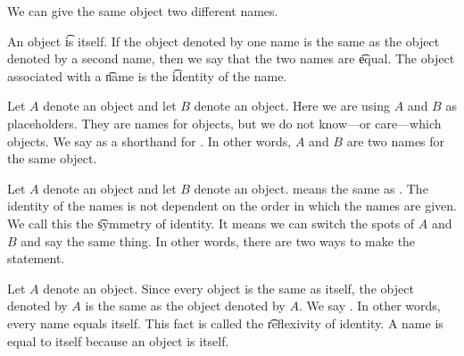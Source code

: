 

We can give the same object two different names.


An object \t{is} itself.
If the object denoted by one name is the same as the object denoted by a second name, then we say that the two names are \t{equal}.
The object associated with a \t{name} is the \t{identity} of the name.

Let $A$ denote an object and let $B$ denote an object.
Here we are using $A$ and $B$ as placeholders.
They are names for objects, but we do not know---or care---which objects.
We say  as a shorthand for .
In other words, $A$ and $B$ are two names for the same object.


Let $A$ denote an object and let $B$ denote an object.
 means the same as .
The identity of the names is not dependent on the order in which the names are given.
We call this the \t{symmetry of identity}.
It means we can switch the spots of $A$ and $B$ and say the same thing.
In other words, there are two ways to make the statement.



Let $A$ denote an object.
Since every object is the same as itself, the object denoted by $A$ is the same as the object denoted by $A$.
We say .
In other words, every name equals itself.
This fact is called the \t{reflexivity of identity}.
A name is equal to itself because an object is itself.


%
%
%
%

